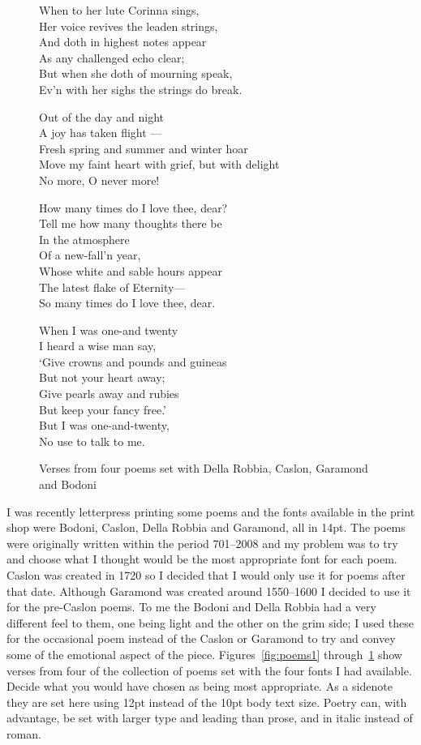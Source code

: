 \documentclass[10pt,letterpaper,extrafontsizes]{memoir}
\newcommand*{\thisfont}[5]{\fontencoding{T1}%
  \fontsize{#1}{#2}\fontfamily{#3}\fontseries{#4}\fontshape{#5}%
  \selectfont}
\newcommand*{\pickfont}[1]{\thisfont{12}{14}{#1}{m}{n}}
\newcommand*{\caslon}{\pickfont{5ca}}
\newcommand*{\garamond}{\pickfont{5gm}}
\newcommand*{\della}{\pickfont{5de}}
\newcommand*{\bodoni}{\pickfont{5bd}}
\renewcommand*{\pickfont}[1]{\thisfont{12}{14}{ppl}{m}{n}}
\newcommand*{\Shelley}{%
\hspace*{2em} Out of the day and night \\
\hspace*{2em} A joy has taken flight --- \\
Fresh spring and summer and winter hoar \\
\hspace*{1em} Move my faint heart with grief, but with delight \\
\hspace*{2em} No more, O never more!}
\newcommand*{\Beddoes}{%
How many times do I love thee, dear? \\
\hspace*{1em} Tell me how many thoughts there be \\
\hspace*{4em} In the atmosphere \\
\hspace*{4em} Of a new-fall'n year, \\
Whose white and sable hours appear \\
\hspace*{1em} The latest flake of Eternity--- \\
So many times do I love thee, dear.}
\newcommand*{\Campion}{%
When to her lute Corinna sings, \\
Her voice revives the leaden strings, \\
And doth in highest notes appear \\
As any challenged echo clear; \\
But when she doth of mourning speak, \\
Ev'n with her sighs the strings do break.}
\newcommand*{\Housman}{%
When I was one-and twenty \\
\hspace*{1em} I heard a wise man say, \\
`Give crowns and pounds and guineas \\
\hspace*{1em} But not your heart away; \\
Give pearls away and rubies \\
\hspace*{1em} But keep your fancy free.' \\
But I was one-and-twenty, \\
\hspace*{1em} No use to talk to me.}
\begin{document}
\begin{figure}
\begin{adjustwidth}{-0.05\textwidth}{-0.05\textwidth}
\centering
\begin{minipage}[t]{0.52\textwidth}\della
\Campion
\end{minipage}
\hfill
\begin{minipage}[t]{0.52\textwidth}\caslon
\Shelley
\end{minipage}

\vspace*{2\onelineskip}

\begin{minipage}[t]{0.52\textwidth}\garamond
\Beddoes
\end{minipage}
\hfill
\begin{minipage}[t]{0.52\textwidth}\bodoni
\Housman
\end{minipage}
\caption{Verses from four poems set with Della Robbia, Caslon, Garamond and Bodoni}\label{fig:poems4}
\end{adjustwidth}
\end{figure}


    I was recently letterpress printing some poems and the fonts  
available in the print shop were Bodoni, 
Caslon, Della Robbia and 
Garamond, 
all in 14pt. The poems
were originally written within the period 701--2008 and my problem was to
try and choose what I thought would be the most appropriate font for each
poem. Caslon was created in 1720 so I decided that 
I would only use it for poems after that date. Although 
Garamond was created around 1550--1600 I
decided to use it for the pre-Caslon poems. 
To me the Bodoni and 
Della Robbia  
had a very different feel to them, one being light and the other on the grim
side; I used these for the occasional poem instead of the 
Caslon or Garamond
to try and convey some of the emotional aspect of the piece. 
Figures~\ref{fig:poems1} through~\ref{fig:poems4} show verses from four
of the collection of poems set with the four fonts I had available. 
Decide what you would have chosen as being most appropriate. As a 
sidenote they are set here using 12pt instead of the 10pt body text size.
Poetry can, with advantage, be set with larger type and 
leading than prose,
and in italic instead of roman.
\end{document}
